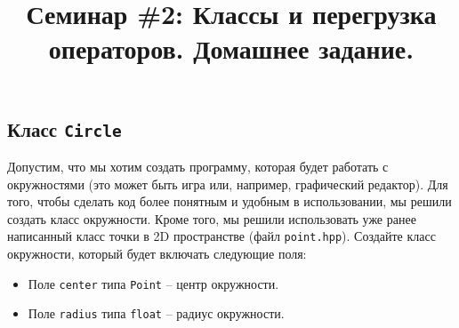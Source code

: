 \documentclass{article}
\begin{document}


\renewcommand{\thesubsection}{\arabic{subsection}}
\makeatletter
\def\@seccntformat#1{\@ifundefined{#1@cntformat}%
   {\csname the#1\endcsname\quad}%
   {\csname #1@cntformat\endcsname}}%
\newcommand\section@cntformat{}     %
\newcommand\subsection@cntformat{Задача \thesubsection.\space} %
\newcommand\subsubsection@cntformat{\thesubsubsection.\space} %
\makeatother

\title{Семинар \#2: Классы и перегрузка операторов. Домашнее задание.\vspace{-5ex}}\date{}\maketitle

\subsection{Класс \texttt{Circle}}
Допустим, что мы хотим создать программу, которая будет работать с окружностями (это может быть игра или, например, графический редактор). Для того, чтобы сделать код более понятным и удобным в использовании, мы решили создать класс окружности. Кроме того, мы решили использовать уже ранее написанный класс точки в 2D пространстве (файл \texttt{point.hpp}). Создайте класс окружности, который будет включать следующие поля:
\begin{itemize}
\item Поле \texttt{center} типа \texttt{Point} -- центр окружности.
\item Поле \texttt{radius} типа \texttt{float} -- радиус окружности.
\end{itemize}
\end{document}

